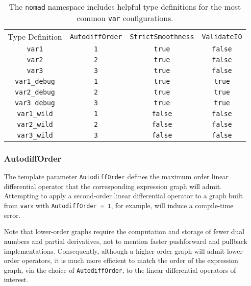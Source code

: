\begin{table*}[t!]
	\centering
	\renewcommand{\arraystretch}{2}
	\begin{tabular}{cccc}
	\rowcolor[gray]{0.9} Type Definition & \verb|AutodiffOrder|
	& \verb|StrictSmoothness| & \verb|ValidateIO| \\
	\verb|var1| & \verb|1| & \verb|true| & \verb|false| \\
	\rowcolor[gray]{0.9} \verb|var2| & \verb|2| & \verb|true| & \verb|false| \\
	\verb|var3| & \verb|3| & \verb|true| & \verb|false| \\
	\rowcolor[gray]{0.9} \verb|var1_debug| & \verb|1| & \verb|true| & \verb|true| \\
	\verb|var2_debug| & \verb|2| & \verb|true| & \verb|true| \\
	\rowcolor[gray]{0.9} \verb|var3_debug| & \verb|3| & \verb|true| & \verb|true| \\
	\verb|var1_wild| & \verb|1| & \verb|false| & \verb|false| \\
	\rowcolor[gray]{0.9} \verb|var2_wild| & \verb|2| & \verb|false| & \verb|false| \\
	\verb|var3_wild| & \verb|3| & \verb|false| & \verb|false| \\
	\end{tabular}
	\caption{The \texttt{nomad} namespace includes helpful type definitions for 
	the most common \texttt{var} configurations.}
	\label{tab:typedefs}
\end{table*}

\subsubsection{AutodiffOrder}

The template parameter \verb|AutodiffOrder| defines the maximum order
linear differential operator that the corresponding expression graph will
admit.  Attempting to apply a second-order linear differential operator
to a graph built from \verb|var|s with \verb|AutodiffOrder = 1|, for example,
will induce a compile-time error.

Note that lower-order graphs require the computation and storage of
fewer dual numbers and partial derivatives, not to mention faster pushforward
and pullback implementations.  Consequently, although a higher-order
graph will admit lower-order operators, it is much more efficient to match
the order of the expression graph, via the choice of \verb|AutodiffOrder|,
to the linear differential operators of interest.

